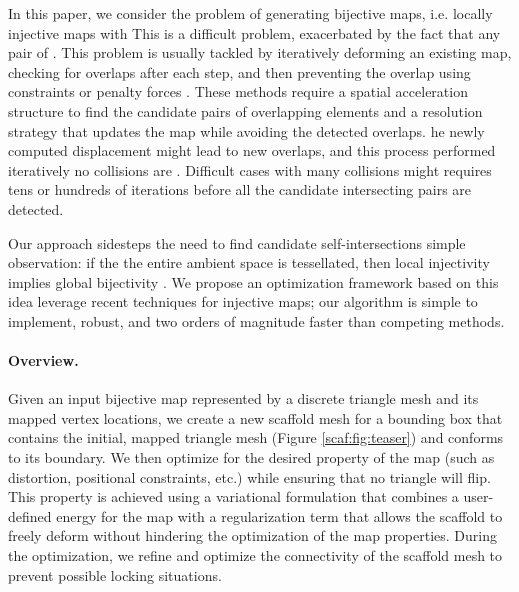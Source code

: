 In this paper, we consider the problem of generating bijective maps, i.e. locally injective maps with  %
This is a difficult problem, exacerbated by the fact that any pair of . %
This problem is usually tackled by iteratively deforming an existing map, checking for overlaps after each step, and then preventing the overlap using constraints \cite{Harmon:2011} or penalty forces \cite{harmon2010robust}. These methods require a spatial acceleration structure to find the candidate pairs of overlapping elements and a resolution strategy that updates the map while avoiding the detected overlaps. he newly computed displacement might  lead to new overlaps, and this process  performed iteratively  no  collisions are . Difficult cases with many collisions might requires tens or hundreds of iterations before all the candidate intersecting pairs are detected.

Our approach sidesteps the need to find candidate self-intersections  simple observation: if the the entire ambient space  is tessellated, then local injectivity implies global bijectivity \cite{Zhang:2005,Lipman:2013ArXiv,Muller:2015}. We  propose an optimization framework based on this idea  leverage recent techniques for  injective maps; our algorithm is simple to implement, robust, and two orders of magnitude faster than competing methods.

\paragraph{Overview.} Given an input bijective map represented by a discrete triangle mesh and its mapped vertex locations, we create a new scaffold mesh for a bounding box that contains the initial, mapped triangle mesh (Figure \ref{scaf:fig:teaser}) and conforms to its boundary. We then optimize for the desired property of the map (such as distortion, positional constraints, etc.) while ensuring that no triangle will flip. This property is achieved using a variational formulation that combines a user-defined energy for the map with a regularization term that allows the scaffold to freely deform without hindering the optimization of the map properties. During the optimization, we refine and optimize the connectivity of the scaffold mesh to prevent possible locking situations.


